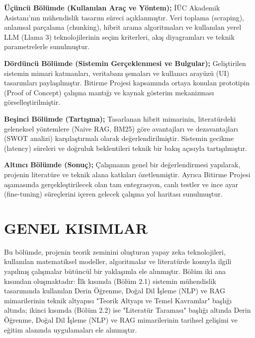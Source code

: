 \documentclass[12pt,a4paper]{report}
\begin{document}
\textbf{Üçüncü Bölümde (Kullanılan Araç ve Yöntem);} İÜC Akademik Asistanı'nın mühendislik tasarım süreci açıklanmıştır. Veri toplama (scraping), anlamsal parçalama (chunking), hibrit arama algoritmaları ve kullanılan yerel LLM (Llama 3) teknolojilerinin seçim kriterleri, akış diyagramları ve teknik parametrelerle sunulmuştur.

\textbf{Dördüncü Bölümde (Sistemin Gerçeklenmesi ve Bulgular);} Geliştirilen sistemin mimari katmanları, veritabanı şemaları ve kullanıcı arayüzü (UI) tasarımları paylaşılmıştır. Bitirme Projesi kapsamında ortaya konulan prototipin (Proof of Concept) çalışma mantığı ve kaynak gösterim mekanizması görselleştirilmiştir.

\textbf{Beşinci Bölümde (Tartışma);} Tasarlanan hibrit mimarinin, literatürdeki geleneksel yöntemlere (Naive RAG, BM25) göre avantajları ve dezavantajları (SWOT analizi) karşılaştırmalı olarak değerlendirilmiştir. Sistemin gecikme (latency) süreleri ve doğruluk beklentileri teknik bir bakış açısıyla tartışılmıştır.

\textbf{Altıncı Bölümde (Sonuç);} Çalışmanın genel bir değerlendirmesi yapılarak, projenin literatüre ve teknik alana katkıları özetlenmiştir. Ayrıca Bitirme Projesi aşamasında gerçekleştirilecek olan tam entegrasyon, canlı testler ve ince ayar (fine-tuning) süreçlerini içeren gelecek çalışma yol haritası sunulmuştur.

\chapter{GENEL KISIMLAR}

Bu bölümde, projenin teorik zeminini oluşturan yapay zeka teknolojileri, kullanılan matematiksel modeller, algoritmalar ve literatürde konuyla ilgili yapılmış çalışmalar bütüncül bir yaklaşımla ele alınmıştır. Bölüm iki ana kısımdan oluşmaktadır: İlk kısımda (Bölüm 2.1) sistemin mühendislik tasarımında kullanılan Derin Öğrenme, Doğal Dil İşleme (NLP) ve RAG mimarilerinin teknik altyapısı "Teorik Altyapı ve Temel Kavramlar" başlığı altında; ikinci kısımda (Bölüm 2.2) ise "Literatür Taraması" başlığı altında Derin Öğrenme, Doğal Dil İşleme (NLP) ve RAG mimarilerinin tarihsel gelişimi ve eğitim alanında uygulamaları ele alınmıştır.

\end{document}
